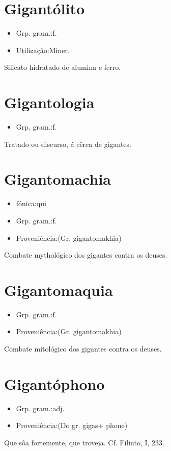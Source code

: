 \section{Gigantólito}
\begin{itemize}
\item {Grp. gram.:f.}
\end{itemize}
\begin{itemize}
\item {Utilização:Miner.}
\end{itemize}
Silicato hidratado de alumina e ferro.
\section{Gigantologia}
\begin{itemize}
\item {Grp. gram.:f.}
\end{itemize}
Tratado ou discurso, á cêrca de gigantes.
\section{Gigantomachia}
\begin{itemize}
\item {fónica:qui}
\end{itemize}
\begin{itemize}
\item {Grp. gram.:f.}
\end{itemize}
\begin{itemize}
\item {Proveniência:(Gr. \textunderscore gigantomakhia\textunderscore )}
\end{itemize}
Combate mythológico dos gigantes contra os deuses.
\section{Gigantomaquia}
\begin{itemize}
\item {Grp. gram.:f.}
\end{itemize}
\begin{itemize}
\item {Proveniência:(Gr. \textunderscore gigantomakhia\textunderscore )}
\end{itemize}
Combate mitológico dos gigantes contra os deuses.
\section{Gigantóphono}
\begin{itemize}
\item {Grp. gram.:adj.}
\end{itemize}
\begin{itemize}
\item {Proveniência:(Do gr. \textunderscore gigas\textunderscore  + \textunderscore phone\textunderscore )}
\end{itemize}
Que sôa fortemente, que troveja. Cf. Filinto, I, 233.
